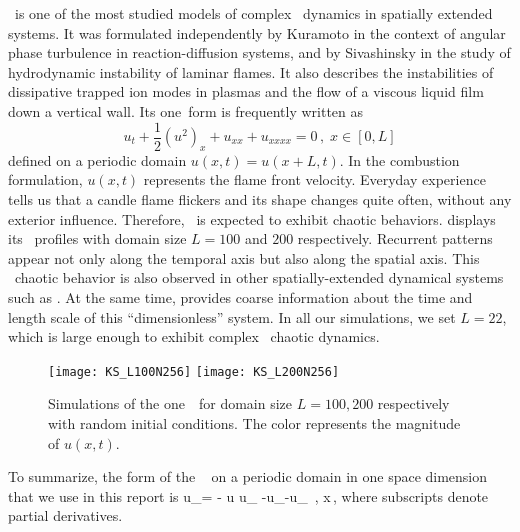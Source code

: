 

\KSe\ is one of the most studied models of
complex \spt\ dynamics in spatially extended systems.
It was formulated
independently by Kuramoto in the context of angular phase
turbulence in reaction-diffusion systems, and
by Sivashinsky in the study of hydrodynamic instability of laminar
flames.
It also describes the instabilities of
dissipative trapped ion modes in plasmas and the
flow of a viscous liquid film down a vertical wall.
Its one\dmn\ form is frequently written as
\begin{equation}
  u_t+\frac{1}{2}(u^2)_x+u_{xx}+u_{xxxx}=0\,,\; x\in [0,L]
  \label{eq:ks}
\end{equation}
defined on a periodic domain $u(x, t) = u(x+L, t)$.
In the combustion formulation, $u(x, t)$ represents the
flame front velocity. Everyday experience tells us that a candle flame
flickers and its shape changes quite often, without any exterior influence.
Therefore, \KSe\ is expected to exhibit chaotic behaviors.
 displays its \spt\ profiles with
domain size $L=100$ and $200$ respectively. Recurrent patterns appear not
only along the temporal axis but also along the spatial axis. This \spt\
chaotic behavior is also observed in other spatially-extended dynamical
systems such as \cGLe\rf{SPScgl92}.
At the same time,  provides coarse information about
the time and length scale of this ``dimensionless'' system.
In all our simulations, we set $L = 22$, which is large enough to exhibit
complex \spt\ chaotic dynamics{\rf{SCD07}}.

\begin{figure}
  \centering
  \texttt{[image: KS\_L100N256]}
  \texttt{[image: KS\_L200N256]}
  \caption[\Spt\ plots of the one\dmn\ \KSe\ for $L=100$ and $200$.]{
    Simulations of the one\dmn\ \KSe\ for domain size $L=100, 200$ respectively with random initial
    conditions. The color represents the magnitude of $u(x, t)$.
  }
  \label{fig:KS_L100200}
\end{figure}

To summarize, the form of the \KSe\  on a periodic domain in one
space dimension that we use in this report is
\beq
    u_\zeit =  - u u_\conf
    -u_{\conf \conf}-u_{\conf \conf \conf \conf}
\,,\qquad
    x\in [0,L]
\,,
where subscripts denote partial derivatives.